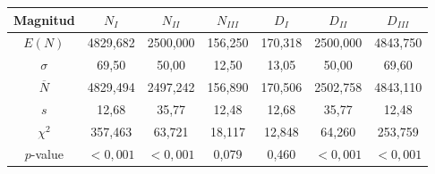 \begin{tabular}{c|cccccc}
\hline
Magnitud & $N_I$ & $N_{II}$ & $N_{III}$ & $D_I$ & $D_{II}$ & $D_{III}$ \\
\hline
$E(N)$ & 4829{,}682 & 2500{,}000 & 156{,}250 & 170{,}318 & 2500{,}000 & 4843{,}750 \\
$\sigma$ & 69{,}50 & 50{,}00 & 12{,}50 & 13{,}05 & 50{,}00 & 69{,}60 \\
$\overline{N}$ & 4829{,}494 & 2497{,}242 & 156{,}890 & 170{,}506 & 2502{,}758 & 4843{,}110 \\
$s$ & 12{,}68 & 35{,}77 & 12{,}48 & 12{,}68 & 35{,}77 & 12{,}48 \\
$\chi^2$ & 357{,}463 & 63{,}721 & 18{,}117 & 12{,}848 & 64{,}260 & 253{,}759 \\
$p$-value & $<0{,}001$ & $<0{,}001$ & 0{,}079 & 0{,}460 & $<0{,}001$ & $<0{,}001$ \\
\hline
\end{tabular}

